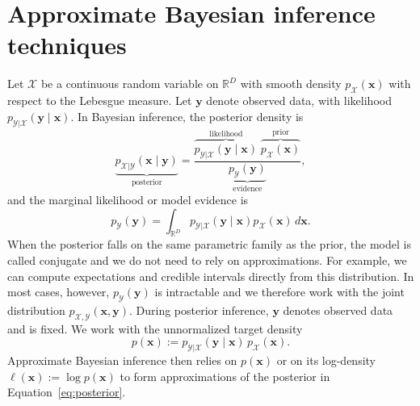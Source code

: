 \section{Approximate Bayesian inference techniques}
Let $\mathcal{X}$ be a continuous random variable on $\mathbb{R}^D$ with smooth density $p_{\mathcal{X}}(\boldsymbol{x})$ with respect to the Lebesgue measure. Let $\boldsymbol{y}$ denote observed data, with likelihood $p_{\mathcal{Y}|\mathcal{X}}(\boldsymbol{y}\mid\boldsymbol{x})$. In Bayesian inference, the posterior density is
\begin{equation}
\underbrace{p_{\mathcal{X}|\mathcal{Y}}(\boldsymbol{x}\mid \boldsymbol{y})}_{\text{posterior}}
=
\frac{
\overbrace{ p_{\mathcal{Y}|\mathcal{X}}(\boldsymbol{y}\mid\boldsymbol{x})  }^{\text{likelihood}}
\;
\overbrace{ p_{\mathcal{X}}(\boldsymbol{x}) }^{\text{prior}}
}{
\underbrace{ p_{\mathcal{Y}}(\boldsymbol{y}) }_{\text{evidence}}
},
\label{eq:posterior}
\end{equation}
and the marginal likelihood or model evidence is
\begin{equation*}
    p_{\mathcal{Y}}(\boldsymbol{y})=\int_{\mathbb{R}^D} p_{\mathcal{Y}|\mathcal{X}}(\boldsymbol{y}\mid\boldsymbol{x})p_{\mathcal{X}}(\boldsymbol{x})\,d\boldsymbol{x}.
\end{equation*}
When the posterior falls on the same parametric family as the prior, the model is called conjugate and we do not need to rely on approximations. For example, we can compute expectations and credible intervals directly from this distribution. In most cases, however, $p_{\mathcal{Y}}(\boldsymbol{y})$ is intractable and we therefore work with the joint distribution $p_{\mathcal{X},\mathcal{Y}}(\boldsymbol{x},\boldsymbol{y})$. During posterior inference, $\boldsymbol{y}$ denotes observed data and is fixed. We work with the unnormalized target density
\begin{equation}
    p(\boldsymbol{x}) := p_{\mathcal{Y}|\mathcal{X}}(\boldsymbol{y}\mid\boldsymbol{x})\,p_{\mathcal{X}}(\boldsymbol{x}).
\end{equation}
Approximate Bayesian inference then relies on $p(\boldsymbol{x})$ or on its log-density $\ell(\boldsymbol{x}) := \log p(\boldsymbol{x})$ to form approximations of the posterior in Equation~\ref{eq:posterior}.

